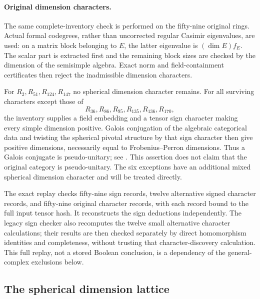 \documentclass[11pt,a4paper]{article}
\begin{document}
\paragraph{Original dimension characters.}
The same complete-inventory check is performed on the fifty-nine original
rings. Actual formal codegrees, rather than uncorrected regular Casimir
eigenvalues, are used: on a matrix block belonging to $E$, the latter
eigenvalue is $(\dim E)f_E$. The scalar part is extracted first and the
remaining block sizes are checked by the dimension of the semisimple
algebra. Exact norm and field-containment certificates then reject the
inadmissible dimension characters.

For $R_2,R_{51},R_{124},R_{147}$ no spherical dimension character remains.
For all surviving characters except those of
\[
 R_{36},R_{86},R_{95},R_{135},R_{136},R_{170},
\]
the inventory supplies a field embedding and a tensor sign character
making every simple dimension positive. Galois conjugation of the
algebraic categorical data and twisting the spherical pivotal structure
by that sign character then give positive dimensions, necessarily equal
to Frobenius--Perron dimensions. Thus a Galois conjugate is pseudo-unitary;
see \cite[Section~8.4]{ENO}. This assertion does not claim that the original
category is pseudo-unitary. The six exceptions have an additional mixed
spherical dimension character and will be treated directly.

The exact replay checks fifty-nine sign records, twelve alternative signed
character records, and fifty-nine original character records, with each
record bound to the full input tensor hash. It reconstructs the sign
deductions independently. The legacy sign checker also recomputes the
twelve small alternative character calculations; their results are then
checked separately by direct homomorphism identities and completeness,
without trusting that character-discovery calculation. This full replay,
not a stored Boolean conclusion, is a dependency of the general-complex
exclusions below.

\subsection{The spherical dimension lattice}
\label{subsec:r11-dimension-lattice}
\end{document}
